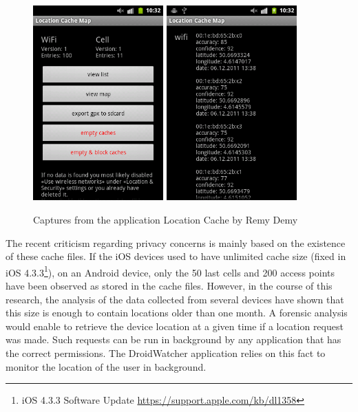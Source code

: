 \begin{figure}[h]
  \centering
  \includegraphics[width=5cm]{images/cache1.png}
  \includegraphics[width=5cm]{images/cache2.png}
  \caption{Captures from the application Location Cache by Remy Demy}
  \label{fig:locmap}
\end{figure}

The recent criticism regarding privacy concerns is mainly based on the existence of these cache files.
If the iOS devices used to have unlimited cache size (fixed in iOS 4.3.3\footnote{iOS 4.3.3 Software Update \url{https://support.apple.com/kb/dl1358}}), on an Android device, only the 50 last cells and 200 access points have been observed as stored in the cache files.
However, in the course of this research, the analysis of the data collected from several devices have shown that this size is enough to contain locations older than one month.
A forensic analysis would enable to retrieve the device location at a given time if a location request was made.
Such requests can be run in background by any application that has the correct permissions.
The DroidWatcher application relies on this fact to monitor the location of the user in background.\\

